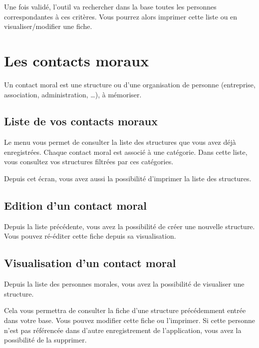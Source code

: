 \documentclass[a4paper,10pt,oneside,french]{sphinxmanual}
\begin{document}
Une fois validé, l’outil va rechercher dans la base toutes les personnes correspondantes à ces critères. Vous pourrez alors imprimer cette liste ou en visualiser/modifier une fiche.

\noindent{}


\section{Les contacts moraux}
\label{\detokenize{contacts/legal_entity::doc}}\label{\detokenize{contacts/legal_entity:les-contacts-moraux}}
Un contact moral est une structure ou d’une organisation de personne (entreprise, association, administration, …), à mémoriser.


\subsection{Liste de vos contacts moraux}
\label{\detokenize{contacts/legal_entity:liste-de-vos-contacts-moraux}}
Le menu  vous permet de consulter la liste des structures que vous avez déjà enregistrées. Chaque contact moral est associé à une catégorie. Dans cette liste, vous consultez vos structures filtrées par ces catégories.

Depuis cet écran, vous avez aussi la possibilité d’imprimer la liste des structures.

\noindent{}


\subsection{Edition d’un contact moral}
\label{\detokenize{contacts/legal_entity:edition-d-un-contact-moral}}
Depuis la liste précédente, vous avez la possibilité de créer une nouvelle structure. Vous pouvez ré-éditer cette fiche depuis sa visualisation.

\noindent{}


\subsection{Visualisation d’un contact moral}
\label{\detokenize{contacts/legal_entity:visualisation-d-un-contact-moral}}
Depuis la liste des personnes morales, vous avez la possibilité de visualiser une structure.

Cela vous permettra de consulter la fiche d’une structure précédemment entrée dans votre base. Vous pouvez modifier cette fiche ou l’imprimer. Si cette personne n’est pas référencée dans d’autre enregistrement de l’application, vous avez la possibilité de la supprimer.
\end{document}

